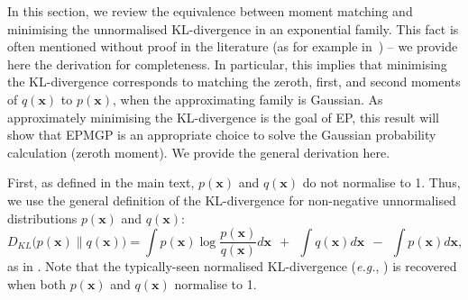 \documentclass[twoside,11pt]{article}
\def\x{{\mathbf x}}
\begin{document}
In this section, we review the equivalence between moment matching and minimising the unnormalised KL-divergence in an exponential family. This fact is often mentioned without proof in the literature (as for example in~\cite{minkaMSFTTR2005}) -- we provide here the derivation for completeness. In particular, this implies that minimising the KL-divergence corresponds to matching the zeroth, first, and second moments of $q(\x)$ to $p(\x)$, when the approximating family is Gaussian.  As approximately minimising the KL-divergence is the goal of EP, this result will show that EPMGP is an appropriate choice to solve the Gaussian probability calculation (zeroth moment). We provide the general derivation here.

First, as defined in the main text, $p(\x)$ and $q(\x)$ do not normalise to 1. Thus, we use the general definition of the KL-divergence for non-negative unnormalised distributions $p(\x)$ and $q(\x)$:
\begin{equation}
\label{eqn:KLfg}
D_{KL}\bigl(p(\x)\parallel q(\x)\bigr) = \int p(\x) \log \frac{p(\x)}{q(\x)} d\x
~~+~~\int q(\x)d\x ~~-~~ \int p(\x)d\x,
\end{equation}
as in \cite[]{zhu95infogeom, minkaMSFTTR2005}.  Note that the typically-seen normalised KL-divergence ({\it e.g.}, \cite{CoverandThomas}) is recovered when both $p(\x)$ and $q(\x)$ normalise to 1.
\end{document}
